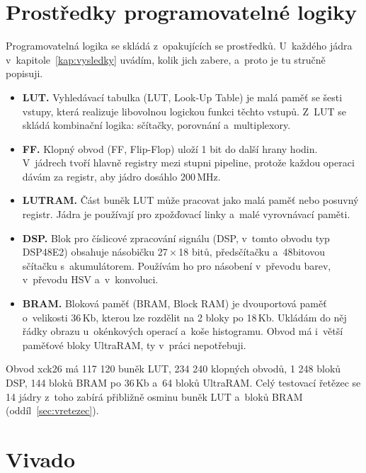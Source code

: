 \section{Prostředky programovatelné logiky}
\label{sec:prostredky}

Programovatelná logika se skládá z~opakujících se prostředků. U~každého jádra v~kapitole~\ref{kap:vysledky} uvádím, kolik jich zabere, a~proto je tu stručně popisuji.

\begin{itemize}
    \item \textbf{LUT.} Vyhledávací tabulka (\acs{LUT}, Look-Up Table) je malá paměť se šesti vstupy, která realizuje libovolnou logickou funkci těchto vstupů. Z~LUT se skládá kombinační logika: sčítačky, porovnání a~multiplexory.
    \item \textbf{FF.} Klopný obvod (\acs{FF}, Flip-Flop) uloží 1 bit do další hrany hodin. V~jádrech tvoří hlavně registry mezi stupni pipeline, protože každou operaci dávám za registr, aby jádro dosáhlo 200\,MHz.
    \item \textbf{LUTRAM.} Část buněk LUT může pracovat jako malá paměť nebo posuvný registr. Jádra je používají pro zpožďovací linky a~malé vyrovnávací paměti.
    \item \textbf{DSP.} Blok pro číslicové zpracování signálu (\acs{DSP}, v~tomto obvodu typ DSP48E2) obsahuje násobičku 27\,×\,18 bitů, předsčítačku a~48bitovou sčítačku s~akumulátorem. Používám ho pro násobení v~převodu barev, v~převodu HSV a~v~konvoluci.
    \item \textbf{BRAM.} Bloková paměť (\acs{BRAM}, Block RAM) je dvouportová paměť o~velikosti 36\,Kb, kterou lze rozdělit na 2 bloky po 18\,Kb. Ukládám do něj řádky obrazu u~okénkových operací a~koše histogramu. Obvod má i~větší paměťové bloky UltraRAM, ty v~práci nepotřebuji.
\end{itemize}

Obvod xck26 má 117 120 buněk LUT, 234 240 klopných obvodů, 1 248 bloků DSP, 144 bloků BRAM po 36\,Kb a~64 bloků UltraRAM. Celý testovací řetězec se 14 jádry z~toho zabírá přibližně osminu buněk LUT a~bloků BRAM (oddíl~\ref{sec:vretezec}).


\section{Vivado}
\label{sec:vivado}

